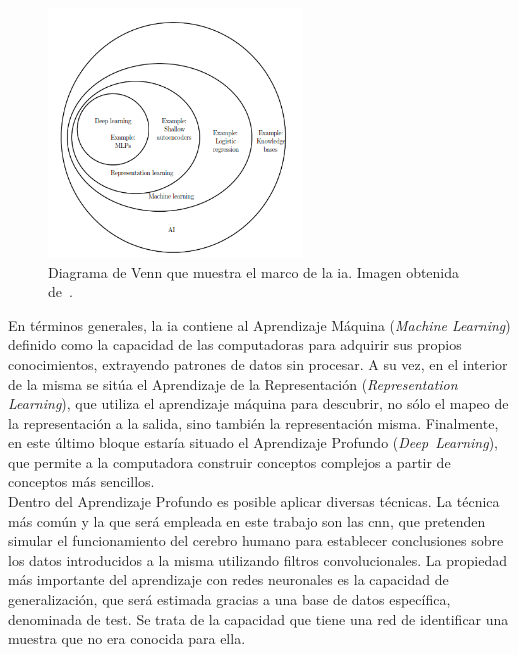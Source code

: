\begin{figure}[H]
	\begin{center}
		\includegraphics[width=0.6\textwidth]{figures/aprendizaje}
		\caption{Diagrama de Venn que muestra el marco de la \acrshort{ia}. Imagen obtenida de~\cite{Goodfellow-et-al-2016}.}
		\label{fig.aprendizaje}
	\end{center}
\end{figure}

En términos generales, la \acrshort{ia} contiene al Aprendizaje Máquina (\textit{Machine Learning}) definido como la capacidad de las computadoras para adquirir sus propios conocimientos, extrayendo patrones de datos sin procesar. A su vez, en el interior de la misma se sitúa el Aprendizaje de la Representación (\textit{Representation Learning}), que utiliza el aprendizaje máquina para descubrir, no sólo el mapeo de la representación a la salida, sino también la representación misma. Finalmente, en este último bloque estaría situado el Aprendizaje Profundo (\textit{Deep~Learning}), que permite a la computadora construir conceptos complejos a partir de conceptos más sencillos.\\

Dentro del Aprendizaje Profundo es posible aplicar diversas técnicas. La técnica más común y la que será empleada en este trabajo son las \acrfull{cnn}, que pretenden simular el funcionamiento del cerebro humano para establecer conclusiones sobre los datos introducidos a la misma utilizando filtros convolucionales.  La propiedad más importante del aprendizaje con redes neuronales es la capacidad de generalización, que será estimada gracias a una base de datos específica, denominada de test. Se trata de la capacidad que tiene una red de identificar una muestra que no era conocida para ella.\\

